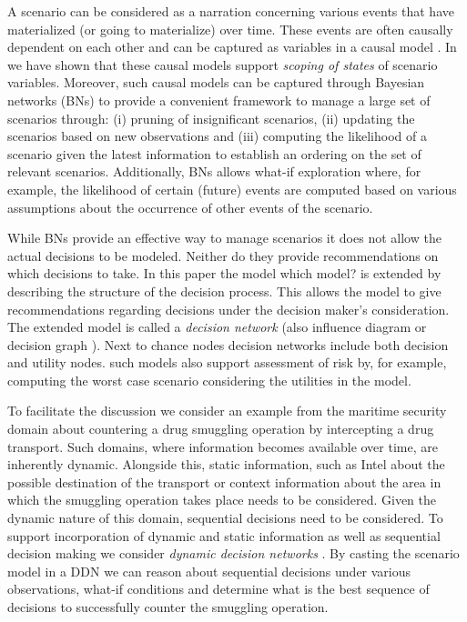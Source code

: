 \documentclass[conference]{IEEEtran}
\begin{document}
A scenario can be considered as a narration concerning various events that have materialized (or going to materialize) over time. These events are often causally dependent on each other and can be captured as variables in a causal model \cite{pearl00book}. In \cite{conrado14if} we have shown that these causal models support {\em scoping of states} of scenario variables. Moreover, such causal models can be captured through Bayesian networks (BNs) \cite{pearl88book, jensen07book} to provide a convenient framework to manage a large set of scenarios through: (i) pruning of insignificant scenarios, (ii) updating the scenarios based on new observations and (iii) computing the likelihood of a scenario given the latest information to establish an ordering on the set of relevant scenarios. Additionally, BNs allows what-if exploration where, for example, the likelihood of certain (future) events are computed based on various assumptions about the occurrence of other events of the scenario.

While BNs provide an effective way to manage scenarios it does not allow the actual decisions to be modeled. Neither do they provide recommendations on which decisions to take. In this paper the model {\red which model?} is extended by describing the structure of the decision process. This allows the model to give recommendations regarding decisions under the decision maker's consideration. The extended model is called a {\em decision network} \cite{russell02bn} (also influence diagram or decision graph \cite{jensen07book}). Next to chance nodes decision networks include both decision and utility nodes. such models also support assessment of risk by, for example, computing the worst case scenario considering the utilities in the model.

To facilitate the discussion we consider an example from the maritime security domain about countering a drug smuggling operation by intercepting a drug transport. Such domains, where information becomes available over time, are inherently dynamic. Alongside this, static information, such as Intel about the possible destination of the transport or context information about the area in which the smuggling operation takes place needs to be considered. Given the dynamic nature of this domain, sequential decisions need to be considered. To support incorporation of dynamic and static information as well as sequential decision making we consider {\em dynamic decision networks} \cite{russell02bn, jensen07book}. By casting the scenario model in a DDN we can reason about sequential decisions under various observations, what-if conditions and determine what is the best sequence of decisions to successfully counter the smuggling operation.
\end{document}
